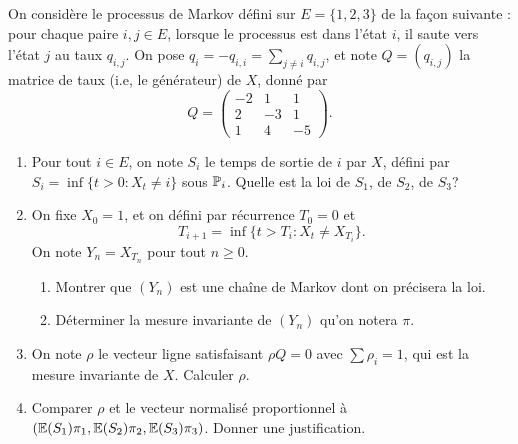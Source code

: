 \documentclass[]{exercices}
\begin{document}
\begin{exercice}
On considère le processus de Markov défini sur $E = \{1,2,3\}$ de la façon suivante : pour chaque paire $i,j \in E$, lorsque le processus est dans l'état $i$, il saute vers l'état $j$ au taux $q_{i,j}$. On pose $q_i = -q_{i,i} = \sum_{j \neq i} q_{i,j}$, et note $Q = (q_{i,j})$ la matrice de taux (i.e, le générateur) de $X$, donné par
\[
  Q = \left( \begin{array}{ccc}
    -2 & 1 & 1\\
    2 & -3 & 1 \\
    1 & 4 & -5
  \end{array} \right).
\]
\begin{enumerate}
\item Pour tout $i \in E$, on note $S_i$ le temps de sortie de $i$ par $X$, défini par $S_i = \inf\{t > 0 : X_t \neq i\}$ sous $\P_i$. Quelle est la loi de $S_1$, de $S_2$, de $S_3$?
\item On fixe $X_0 = 1$, et on défini par récurrence $T_0 = 0$ et
\[
  T_{i+1} = \inf\{t > T_i : X_{t} \neq X_{T_i}\}.
\]
On note $Y_n = X_{T_n}$ pour tout $n \geq 0$.
\begin{enumerate}
  \item Montrer que $(Y_n)$ est une chaîne de Markov dont on précisera la loi.
  \item Déterminer la mesure invariante de $(Y_n)$ qu'on notera $\pi$.
\end{enumerate}
\item On note $\rho$ le vecteur ligne satisfaisant $\rho Q = 0$ avec $\sum \rho_i = 1$, qui est la mesure invariante de $X$. Calculer $\rho$.
\item Comparer $\rho$ et le vecteur normalisé proportionnel à $(\E(S_1)\pi_1,\E(S_2)\pi_2, \E(S_3)\pi_3)$. Donner une justification.
\end{enumerate}
\end{exercice}
\end{document}
